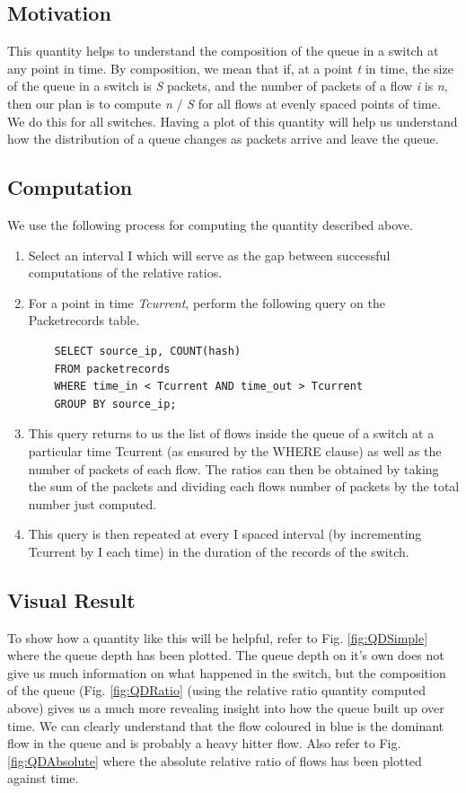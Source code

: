 \subsection{Motivation}
This quantity helps to understand the composition of the queue in a switch at any point in time. By composition, we mean that if, at a point \emph{t} in time,
the size of the queue in a switch is \emph{S} packets, and the number of packets of a flow \emph{i} is \emph{n}, then our plan is to compute \emph{n} / \emph{S} for all flows
at evenly spaced points of time. We do this for all switches. Having a plot of this quantity will help us understand how the distribution of a queue changes as packets arrive
and leave the queue.

\subsection{Computation}
We use the following process for computing the quantity described above.

\begin{enumerate}
    \item Select an interval I which will serve as the gap between successful computations of the relative ratios.
    \item For a point in time \emph{Tcurrent}, perform the following query on the Packetrecords table.
    \begin{verbatim}
    SELECT source_ip, COUNT(hash) 
    FROM packetrecords
    WHERE time_in < Tcurrent AND time_out > Tcurrent
    GROUP BY source_ip;
    \end{verbatim}
    \item This query returns to us the list of flows inside the queue of a switch at a particular time Tcurrent (as ensured by the WHERE clause) as well as the number of packets of
    each flow. The ratios can then be obtained by taking the sum of the packets and dividing each flows number of packets by the total number just computed.
    \item This query is then repeated at every I spaced interval (by incrementing Tcurrent by I each time) in the duration of the records of the switch.
\end{enumerate}

\subsection{Visual Result}
To show how a quantity like this will be helpful, refer to Fig. \ref{fig:QDSimple} where the queue depth has been plotted. The queue depth on it's own does not give us much information on what happened
in the switch, but the composition of the queue (Fig. \ref{fig:QDRatio} (using the relative ratio quantity computed above) gives us a much more revealing insight into how the queue built up over time.
We can clearly understand that the flow coloured in blue is the dominant flow in the queue and is probably a heavy hitter flow. Also refer to Fig. \ref{fig:QDAbsolute} where the absolute relative ratio
of flows has been plotted against time.

